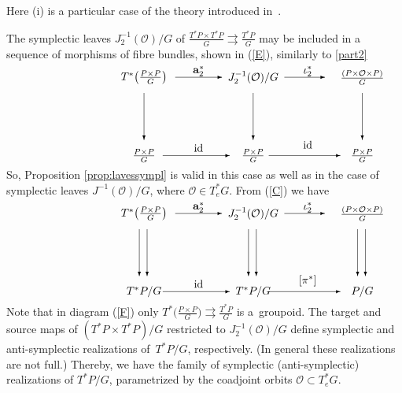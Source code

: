 \documentclass[10pt,a4paper]{amsart}
\renewcommand{\O}{\mathcal{O}}
\newcommand{\tto}{\rightrightarrows}
\DeclareMathOperator{\anch}{\mathbf{a}}
\newcommand{\id}{\text{\upshape id}}
\numberwithin{equation}{section}
\begin{document}
Here (i) is a particular case of the theory introduced in~\cite{Weinstein:1987}.

The symplectic leaves $J_2^{-1}(\O)/G$ of $\frac{T^*P\times T^*P}{G}\tto \frac{T^*P}{G}$ may be included in a sequence of morphisms of f\/ibre bundles, shown in (\ref{E}), similarly to \eqref{part2}
\begin{gather}\label{E}\begin{split}&\unitlength=5mm\begin{picture}(11,5.6)(-4,0)
 \put(-2,5){\makebox(0,0){$T^*\big(\frac{P\times P}{G}\big)$}}
 \put(5,5){\makebox(0,0){$J_2^{-1}(\O)/G$}}
 \put(12,5){\makebox(0,0){$\frac{(P\times \O \times P)}{G}$}}
 \put(-2,0){\makebox(0,0){$\frac{P\times P}{G}$}}
 \put(5,0){\makebox(0,0){$\frac{P\times P}{G}$}}
 \put(12,0){\makebox(0,0){$\frac{P\times P}{G}$}}
 \put(5,4){\vector(0,-1){3}}
 \put(-2,4){\vector(0,-1){3}}
 \put(12,4){\vector(0,-1){3}}
 \put(7,5){\vector(1,0){2.6}}
 \put(6,0){\vector(1,0){4.6}}
 \put(-0.8,0){\vector(1,0){4.3}}
 \put(0,5){\vector(1,0){3}}
 \put(8.5,5.4){\makebox(0,0){$\iota_2^* $}}
 \put(8.5,0.7){\makebox(0,0){$\id$}}
\put(1.5,0.5){\makebox(0,0){$ \id $}}
\put(1.5,5.4){\makebox(0,0){$\anch_2^* $}}
 \end{picture}\end{split}\end{gather}
So, Proposition \ref{prop:lavessympl} is valid in this case as well as in the case of symplectic leaves $J^{-1}(\O)/G$, where $\O\in T^*_eG$. From (\ref{C}) we have
\begin{gather}\label{F}\begin{split}&\unitlength=5mm\begin{picture}(11,5.6)(-4,0)
 \put(-2,5){\makebox(0,0){$T^*\big(\frac{P\times P}{G}\big)$}}
 \put(5,5){\makebox(0,0){$J_2^{-1}(\O)/G$}}
 \put(12,5){\makebox(0,0){$\frac{(P\times \O \times P)}{G}$}}
 \put(-2,0){\makebox(0,0){$T^*P/G$}}
 \put(5,0){\makebox(0,0){$T^*P/G$}}
 \put(12,0){\makebox(0,0){$P/G$}}
 \put(5.2,4){\vector(0,-1){3}}
 \put(4.7,4){\vector(0,-1){3}}
 \put(-2.3,4){\vector(0,-1){3}}
 \put(-1.8,4){\vector(0,-1){3}}
 \put(12.2,4){\vector(0,-1){3}}
 \put(11.7,4){\vector(0,-1){3}}
 \put(7,5){\vector(1,0){2.6}}
 \put(6,0){\vector(1,0){4.6}}
 \put(-0.8,0){\vector(1,0){4.3}}
 \put(0,5){\vector(1,0){3}}
 \put(8.5,5.4){\makebox(0,0){$\iota_2^* $}}
 \put(8.5,0.7){\makebox(0,0){$[\pi^*]$}}
\put(1.5,0.5){\makebox(0,0){$ \id$}}
\put(1.5,5.4){\makebox(0,0){$\anch_2^* $}}
 \end{picture}\end{split}\end{gather}
Note that in diagram (\ref{F}) only $T^*\big(\frac{P\times P}{G}\big)\tto \frac{T^*P}{G}$ is a~groupoid. The target and source maps of $(T^*P\times T^*P)/G$ restricted to $J_2^{-1}(\O)/G$ def\/ine symplectic and anti-symplectic realizations of~$T^*P/G$, respectively. (In general these realizations are not full.) Thereby, we have the family of symplectic (anti-symplectic) realizations of $T^*P/G$, parametrized by the coadjoint orbits $\O\subset T^*_eG$.
\end{document}
